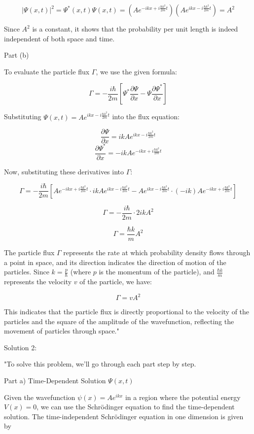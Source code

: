 \[ |\Psi(x,t)|^2 = \Psi^{*}(x,t) \Psi(x,t) = \left(Ae^{-ikx + i\frac{\hbar k^2}{2m}t}\right) \left(Ae^{ikx - i\frac{\hbar k^2}{2m}t}\right) = A^2 \]

Since \( A^2 \) is a constant, it shows that the probability per unit length is indeed independent of both space and time.

Part (b)

To evaluate the particle flux \( \Gamma \), we use the given formula:

\[ \Gamma = -\frac{i\hbar}{2m}\left[ \Psi^{*}\frac{\partial\Psi}{\partial x} - \Psi\frac{\partial\Psi^{*}}{\partial x} \right] \]

Substituting \( \Psi(x,t) = Ae^{ikx - i\frac{\hbar k^2}{2m}t} \) into the flux equation:

\[ \frac{\partial\Psi}{\partial x} = ikAe^{ikx - i\frac{\hbar k^2}{2m}t} \]
\[ \frac{\partial\Psi^{*}}{\partial x} = -ikAe^{-ikx + i\frac{\hbar k^2}{2m}t} \]

Now, substituting these derivatives into \( \Gamma \):

\[ \Gamma = -\frac{i\hbar}{2m}\left[ Ae^{-ikx + i\frac{\hbar k^2}{2m}t} \cdot ikAe^{ikx - i\frac{\hbar k^2}{2m}t} - Ae^{ikx - i\frac{\hbar k^2}{2m}t} \cdot (-ik)Ae^{-ikx + i\frac{\hbar k^2}{2m}t} \right] \]

\[ \Gamma = -\frac{i\hbar}{2m} \cdot 2ikA^2 \]

\[ \Gamma = \frac{\hbar k}{m}A^2 \]

The particle flux \( \Gamma \) represents the rate at which probability density flows through a point in space, and its direction indicates the direction of motion of the particles. Since \( k = \frac{p}{\hbar} \) (where \( p \) is the momentum of the particle), and \( \frac{\hbar k}{m} \) represents the velocity \( v \) of the particle, we have:

\[ \Gamma = vA^2 \]

This indicates that the particle flux is directly proportional to the velocity of the particles and the square of the amplitude of the wavefunction, reflecting the movement of particles through space."

Solution 2:

"To solve this problem, we'll go through each part step by step.

Part a) Time-Dependent Solution \( \Psi(x,t) \)

Given the wavefunction \( \psi(x) = Ae^{ikx} \) in a region where the potential energy \( V(x) = 0 \), we can use the Schrödinger equation to find the time-dependent solution. The time-independent Schrödinger equation in one dimension is given by

